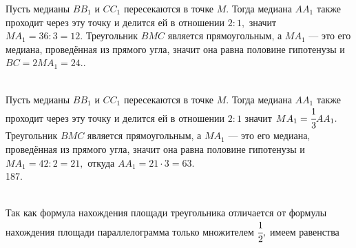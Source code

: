 \documentclass[12pt]{article}
\begin{document}
Пусть медианы $BB_1$ и $CC_1$ пересекаются в точке $M.$ Тогда медиана $AA_1$ также проходит через эту точку и делится ей в отношении $2:1,$ значит $MA_1=36:3=12.$ Треугольник $BMC$ является прямоугольным, а $MA_1$ --- это его медиана, проведённая из прямого угла, значит она равна половине гипотенузы и $BC=2MA_1=24.$\newpage{}. \begin{figure}[ht!]
\end{figure}\\
Пусть медианы $BB_1$ и $CC_1$ пересекаются в точке $M.$ Тогда медиана $AA_1$ также проходит через эту точку и делится ей в отношении $2:1$ значит $MA_1=\cfrac{1}{3}AA_1.$ Треугольник $BMC$ является прямоугольным, а $MA_1$ --- это его медиана, проведённая из прямого угла, значит она равна половине гипотенузы и $MA_1=42:2=21,$ откуда $AA_1=21\cdot3=63.$\\
187. \begin{figure}[ht!]
\end{figure}\\
Так как формула нахождения площади треугольника отличается от формулы нахождения площади параллелограмма только множителем $\cfrac{1}{2},$ имеем равенства
\end{document}
